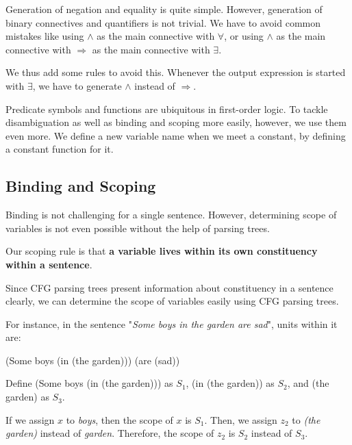 \documentclass{article}
\begin{document}
{{		Generation of negation and equality is quite simple. However, generation of binary connectives and quantifiers is not trivial. We have to avoid common mistakes like using $\wedge $ as the main connective with $\forall $, or using $\wedge $ as the main connective with $\Rightarrow $ as the main connective with $\exists $. 

		We thus add some rules to avoid this. Whenever the output expression is started with $\exists $, we have to generate $\wedge $ instead of $\Rightarrow$. 

		Predicate symbols and functions are ubiquitous in first-order logic. To tackle disambiguation as well as binding and scoping more easily, however, we use them even more. We define a new variable name when we meet a constant, by defining a constant function for it. 
	}

	\subsection{Binding and Scoping}{

		Binding is not challenging for a single sentence. However, determining scope of variables is not even possible without the help of parsing trees. 


		Our scoping rule is that \textbf{a variable lives within its own constituency within a sentence}. 

		Since CFG parsing trees present information about constituency in a sentence clearly, we can determine the scope of variables easily using CFG parsing trees. 


		For instance, in the sentence "\emph{Some boys in the garden are sad}", units within it are: 

		(Some boys (in (the garden))) (are (sad))

		Define (Some boys (in (the garden))) as $S_1$, (in (the garden)) as $S_2 $, and (the garden) as $S_3 $. 

		If we assign $x$ to \emph{boys}, then the scope of $x$ is $S_1$. Then, we assign $z_2$ to \emph{(the garden)} instead of \emph{garden}. Therefore, the scope of $z_2$ is $S_2 $ instead of $S_3 $. 
	}
}
\end{document}
